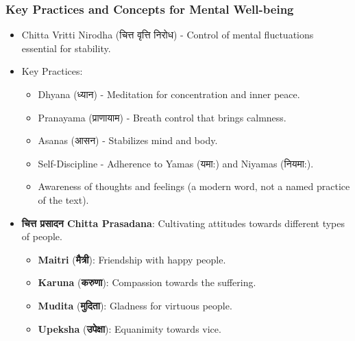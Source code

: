 \begin{frame}[fragile]\frametitle{Key Practices and Concepts for Mental Well-being}

      \begin{itemize}
		\item Chitta Vritti Nirodha (चित्त वृत्ति निरोध) - Control of mental fluctuations essential for stability.
		\item Key Practices: 
		\begin{itemize}
			\item Dhyana (ध्यान) - Meditation for concentration and inner peace.
			\item Pranayama (प्राणायाम) - Breath control that brings calmness.
			\item Asanas (आसन) - Stabilizes mind and body.
			\item Self-Discipline - Adherence to Yamas (यमा:) and Niyamas (नियमा:).
			\item Awareness of thoughts and feelings (a modern word, not a named practice of the text).
		\end{itemize}
        \item \textbf{चित्त प्रसादन  Chitta Prasadana}: Cultivating attitudes towards different types of people.
        \begin{itemize}
            \item \textbf{Maitri} (\textbf{मैत्री}): Friendship with happy people.
            \item \textbf{Karuna} (\textbf{करुणा}): Compassion towards the suffering.
            \item \textbf{Mudita} (\textbf{मुदिता}): Gladness for virtuous people.
            \item \textbf{Upeksha} (\textbf{उपेक्षा}): Equanimity towards vice.
        \end{itemize}
      \end{itemize}

\end{frame}


